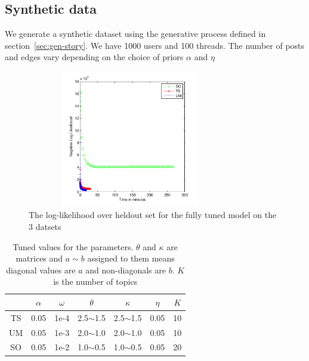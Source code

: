 \documentclass{sig-alternate}
\newcommand{\comment}[1]{\textcolor{red}{[#1]}}
\begin{document}
\subsection{Synthetic data}
We generate a synthetic dataset using the generative process defined in
section~\ref{sec:gen-story}. We have 1000 users and 100 threads. The number of 
posts and edges vary depending on the choice of priors $\alpha$ and $\eta$

 
\begin{figure}
\begin{center}
\includegraphics[height=6cm,width=9cm]{3LLPlots.pdf}
\end{center}
\caption{The log-likelihood over heldout set for the fully tuned model on the
3 datsets}
\label{fig:finalLLheld}
\end{figure}

\begin{table}
\begin{center}
\begin{tabular}{c|c|c|c|c|c|c|}
 & $\alpha$ & $\omega$ & $\theta$ & $\kappa$ & $\eta$ & $K$\\\hline
 TS & 0.05 & 1e-4 & 2.5$\sim$1.5 & 2.5$\sim$1.5& 0.05 & 10\\\hline
 UM & 0.05 & 1e-3 & 2.0$\sim$1.0 & 2.0$\sim$1.0 & 0.05 & 10\\\hline
 SO & 0.05 & 1e-2 & 1.0$\sim$0.5 & 1.0$\sim$0.5 & 0.05 & 20\\\hline
\end{tabular}
\label{tab:tunedParameters}
\end{center}
\caption{Tuned values for the parameters. $\theta$ and $\kappa$ are matrices
and $a\sim b$ assigned to them means diagonal values are $a$ and non-diagonals
are $b$. $K$ is the number of topics}
\end{table}
\end{document}
